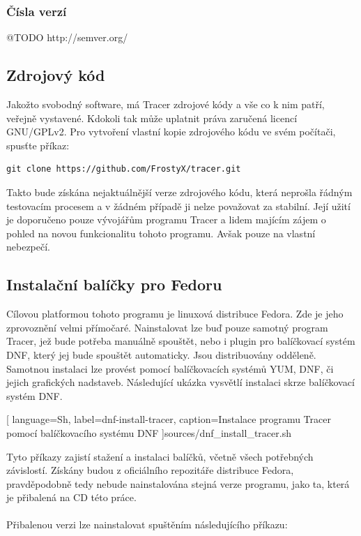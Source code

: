 \documentclass[
  field=inf,
  biblatex,
  glossaries,
  index
]{kidiplom}
\begin{document}
		\subsubsection{Čísla verzí}
		@TODO http://semver.org/

	\subsection{Zdrojový kód}
	Jakožto svobodný software, má Tracer zdrojové kódy a vše co k nim patří, veřejně vystavené. Kdokoli tak může uplatnit práva zaručená licencí GNU/GPLv2. Pro vytvoření vlastní kopie zdrojového kódu ve svém počítači, spusťte příkaz:

	\begin{lstlisting}[gobble=12]
		git clone https://github.com/FrostyX/tracer.git
	\end{lstlisting}

	Takto bude získána nejaktuálnější verze zdrojového kódu, která neprošla řádným testovacím procesem a v žádném případě ji nelze považovat za stabilní. Její užití je doporučeno pouze vývojářům programu Tracer a lidem majícím zájem o pohled na novou funkcionalitu tohoto programu. Avšak pouze na vlastní nebezpečí.

	\subsection{Instalační balíčky pro Fedoru}
	Cílovou platformou tohoto programu je linuxová distribuce Fedora. Zde je jeho zprovoznění velmi přímočaré. Nainstalovat lze buď pouze samotný program Tracer, jež bude potřeba manuálně spouštět, nebo i plugin pro balíčkovací systém DNF\@, který jej bude spouštět automaticky. Jsou distribuovány odděleně. Samotnou instalaci lze provést pomocí balíčkovacích systémů YUM, DNF, či jejich grafických nadstaveb. Následující ukázka vysvětlí instalaci skrze balíčkovací systém DNF.

	
	[
		language=Sh,
		label=dnf-install-tracer,
		caption={Instalace programu Tracer pomocí balíčkovacího systému DNF}
	]{sources/dnf_install_tracer.sh}

	Tyto příkazy zajistí stažení a instalaci balíčků, včetně všech potřebných závislostí. Získány budou z oficiálního repozitáře distribuce Fedora, pravděpodobně tedy nebude nainstalována stejná verze programu, jako ta, která je přibalená na CD této práce.
	\\
	\\
	Přibalenou verzi lze nainstalovat spuštěním následujícího příkazu:
\end{document}
